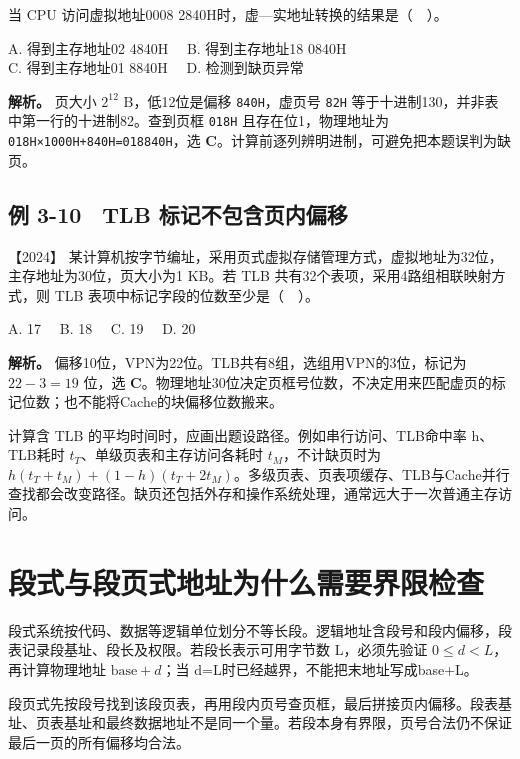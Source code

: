 当 CPU 访问虚拟地址0008 2840H时，虚---实地址转换的结果是（　）。

A. 得到主存地址02 4840H　 B. 得到主存地址18 0840H\\
C. 得到主存地址01 8840H　 D. 检测到缺页异常


\textbf{解析。} 页大小 \(2^{12}\) B，低12位是偏移 \allowbreak{}\texttt{840H}，虚页号 \allowbreak{}\texttt{82H} 等于十进制130，并非表中第一行的十进制82。查到页框 \allowbreak{}\texttt{018H} 且存在位1，物理地址为 \allowbreak{}\texttt{018H×1000H+840H=018840H}，选 \textbf{C}。计算前逐列辨明进制，可避免把本题误判为缺页。

\subsection{例 3-10　TLB 标记不包含页内偏移}\label{co-ex3-10}

\noindent{}【2024】 某计算机按字节编址，采用页式虚拟存储管理方式，虚拟地址为32位，主存地址为30位，页大小为1 KB。若 TLB 共有32个表项，采用4路组相联映射方式，则 TLB 表项中标记字段的位数至少是（　）。

A. 17　 B. 18　 C. 19　 D. 20


\textbf{解析。} 偏移10位，VPN为22位。TLB共有8组，选组用VPN的3位，标记为 \(22-3=19\) 位，选 \textbf{C}。物理地址30位决定页框号位数，不决定用来匹配虚页的标记位数；也不能将Cache的块偏移位数搬来。

计算含 TLB 的平均时间时，应画出题设路径。例如串行访问、TLB命中率 h、TLB耗时 \(t_T\)、单级页表和主存访问各耗时 \(t_M\)，不计缺页时为 \(h(t_T+t_M)+(1-h)(t_T+2t_M)\)。多级页表、页表项缓存、TLB与Cache并行查找都会改变路径。缺页还包括外存和操作系统处理，通常远大于一次普通主存访问。

\section{段式与段页式地址为什么需要界限检查}\label{co-03-13}

段式系统按代码、数据等逻辑单位划分不等长段。逻辑地址含段号和段内偏移，段表记录段基址、段长及权限。若段长表示可用字节数 L，必须先验证 \(0\le d<L\)，再计算物理地址 \(\mathrm{base}+d\)；当 d=L时已经越界，不能把末地址写成base+L。

段页式先按段号找到该段页表，再用段内页号查页框，最后拼接页内偏移。段表基址、页表基址和最终数据地址不是同一个量。若段本身有界限，页号合法仍不保证最后一页的所有偏移均合法。

